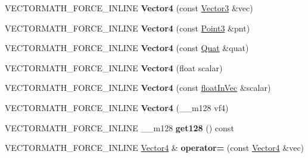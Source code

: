 \begin{DoxyCompactItemize}
V\+E\+C\+T\+O\+R\+M\+A\+T\+H\+\_\+\+F\+O\+R\+C\+E\+\_\+\+I\+N\+L\+I\+NE {\bfseries Vector4} (const \hyperlink{classVectormath_1_1Aos_1_1Vector3}{Vector3} \&vec)
\item 
\mbox{\label{classVectormath_1_1Aos_1_1Vector4_aa9a6005bd217cc94abd52c1265ba6eff}} 
V\+E\+C\+T\+O\+R\+M\+A\+T\+H\+\_\+\+F\+O\+R\+C\+E\+\_\+\+I\+N\+L\+I\+NE {\bfseries Vector4} (const \hyperlink{classVectormath_1_1Aos_1_1Point3}{Point3} \&pnt)
\item 
\mbox{\label{classVectormath_1_1Aos_1_1Vector4_a82a4a71383f2b05c053b00a4f13f9dda}} 
V\+E\+C\+T\+O\+R\+M\+A\+T\+H\+\_\+\+F\+O\+R\+C\+E\+\_\+\+I\+N\+L\+I\+NE {\bfseries Vector4} (const \hyperlink{classVectormath_1_1Aos_1_1Quat}{Quat} \&quat)
\item 
\mbox{\label{classVectormath_1_1Aos_1_1Vector4_ab619fab419710166c719f7c2ff8d55f2}} 
V\+E\+C\+T\+O\+R\+M\+A\+T\+H\+\_\+\+F\+O\+R\+C\+E\+\_\+\+I\+N\+L\+I\+NE {\bfseries Vector4} (float scalar)
\item 
\mbox{\label{classVectormath_1_1Aos_1_1Vector4_afd10162a6052cae82da3f8f17559338c}} 
V\+E\+C\+T\+O\+R\+M\+A\+T\+H\+\_\+\+F\+O\+R\+C\+E\+\_\+\+I\+N\+L\+I\+NE {\bfseries Vector4} (const \hyperlink{classVectormath_1_1floatInVec}{float\+In\+Vec} \&scalar)
\item 
\mbox{\label{classVectormath_1_1Aos_1_1Vector4_a7c5c2a6706f222d41afc6e90bac0577b}} 
V\+E\+C\+T\+O\+R\+M\+A\+T\+H\+\_\+\+F\+O\+R\+C\+E\+\_\+\+I\+N\+L\+I\+NE {\bfseries Vector4} (\+\_\+\+\_\+m128 vf4)
\item 
\mbox{\label{classVectormath_1_1Aos_1_1Vector4_a3e06b2539b0d2e5651819b714a7f62b2}} 
V\+E\+C\+T\+O\+R\+M\+A\+T\+H\+\_\+\+F\+O\+R\+C\+E\+\_\+\+I\+N\+L\+I\+NE \+\_\+\+\_\+m128 {\bfseries get128} () const
\item 
\mbox{\label{classVectormath_1_1Aos_1_1Vector4_a738fa8a9e58a0c07eae2d5c35fa5a3b0}} 
V\+E\+C\+T\+O\+R\+M\+A\+T\+H\+\_\+\+F\+O\+R\+C\+E\+\_\+\+I\+N\+L\+I\+NE \hyperlink{classVectormath_1_1Aos_1_1Vector4}{Vector4} \& {\bfseries operator=} (const \hyperlink{classVectormath_1_1Aos_1_1Vector4}{Vector4} \&vec)

\end{DoxyCompactItemize}
